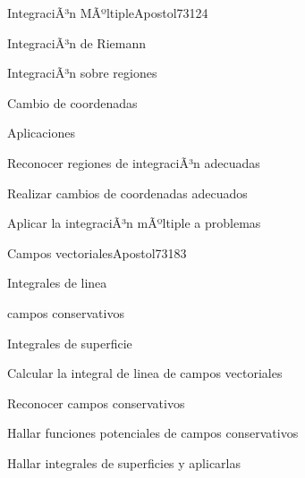\begin{syllabus}
\begin{unit}{IntegraciÃ³n MÃºltiple}{Apostol73}{12}{4}
   \begin{topics}
      \item IntegraciÃ³n de Riemann
      \item IntegraciÃ³n sobre regiones
      \item Cambio de coordenadas
      \item Aplicaciones
      \end{topics}

   \begin{unitgoals}
      \item Reconocer regiones de integraciÃ³n adecuadas
      \item Realizar cambios de coordenadas adecuados
      \item Aplicar la integraciÃ³n mÃºltiple a problemas
      \end{unitgoals}
\end{unit}

\begin{unit}{Campos vectoriales}{Apostol73}{18}{3}
   \begin{topics}
      \item Integrales de linea
      \item campos conservativos
      \item Integrales de superficie
   \end{topics}

   \begin{unitgoals}
      \item Calcular la integral de linea de campos vectoriales
      \item Reconocer campos conservativos
      \item Hallar funciones potenciales de campos conservativos
      \item Hallar integrales de superficies y aplicarlas
      \end{unitgoals}
\end{unit}



\begin{coursebibliography}
\end{coursebibliography}

\end{syllabus}

